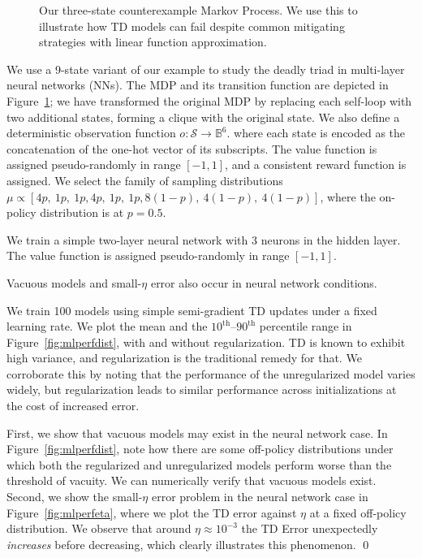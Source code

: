 \begin{figure}
	
	\caption{Our three-state counterexample Markov Process. We use this to illustrate how TD models can fail despite common mitigating strategies with linear function approximation. }\label{fig:mdp9}
\end{figure}


We use a 9-state variant of our example to study the deadly triad in multi-layer neural networks (NNs). The MDP and its transition function are depicted in Figure~\ref{fig:mdp9}; we have transformed the original MDP by replacing each self-loop with two additional states, forming a clique with the original state. We also define a deterministic observation function $o : \mathcal S \to \mathbb B^6$. where each state is encoded as the concatenation of the one-hot vector of its subscripts. The value function is assigned pseudo-randomly in range $[-1, 1]$, and a consistent reward function is assigned.
We select the family of sampling distributions $\mu \propto [4p,~1p,~1p,4p,~1p,~1p,8(1-p),~4(1-p),~4(1-p)]$, where the on-policy distribution is at $p=0.5$.

We train a simple two-layer neural network with 3 neurons in the hidden layer. The value function is assigned pseudo-randomly in range $[-1, 1]$.


\begin{example}
	Vacuous models and small-$\eta$ error also occur in neural network conditions.\label{ex:neuralnetwork}

	\proof We train 100 models using simple semi-gradient TD updates under a fixed learning rate. We plot the mean and the $10^\text{th}$--$90^\text{th}$ percentile range in Figure~\ref{fig:mlperfdist}, with and without regularization.
	TD is known to exhibit high variance, and regularization is the traditional remedy for that. We corroborate this by noting that the performance of the unregularized model varies widely, but regularization leads to similar performance across initializations at the cost of increased error.

	First, we show that vacuous models may exist in the neural network case. In Figure~\ref{fig:mlperfdist}, note how there are some off-policy distributions under which both the regularized and unregularized models perform worse than the threshold of vacuity. We can numerically verify that vacuous models exist. Second, we show the small-$\eta$ error problem in the neural network case in Figure~\ref*{fig:mlperfeta}, where we plot the TD error against $\eta$ at a fixed off-policy distribution. We observe that around $\eta\approx 10^{-3}$ the TD Error unexpectedly \emph{increases} before decreasing, which clearly illustrates this phenomenon.  \qed{}
\end{example}

